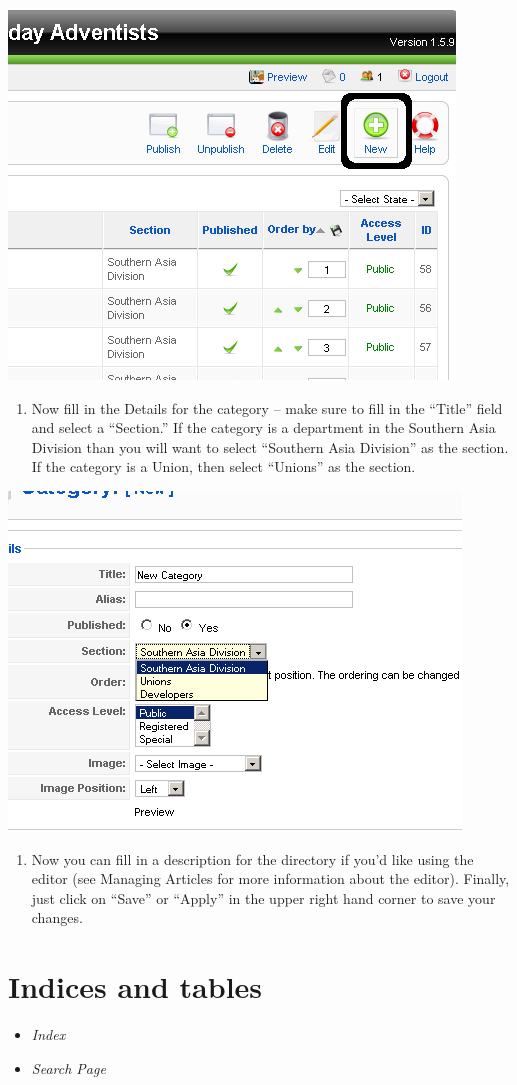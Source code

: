\documentclass[letterpaper,10pt,english]{manual}
\begin{document}
{\hfill\includegraphics{directoryContactCategoriesNewButton1.png}\hfill}
\begin{enumerate}
\item {} 
Now fill in the Details for the category – make sure to fill in the “Title” field and select a “Section.”  If the category is a department in the Southern Asia Division than you will want to select “Southern Asia Division” as the section.  If the category is a Union, then select “Unions” as the section.

\end{enumerate}

{\hfill\includegraphics{directoryContactCategoriesDetails1.png}\hfill}
\begin{enumerate}
\item {} 
Now you can fill in a description for the directory if you'd like using the editor (see Managing Articles for more information about the editor).  Finally, just click on “Save” or “Apply” in the upper right hand corner to save your changes.

\end{enumerate}


\chapter{Indices and tables}
\begin{itemize}
\item {} 
\emph{Index}

\item {} 
\emph{Search Page}

\end{itemize}


\renewcommand{\indexname}{Module Index}
\printmodindex
\renewcommand{\indexname}{Index}
\printindex
\end{document}
